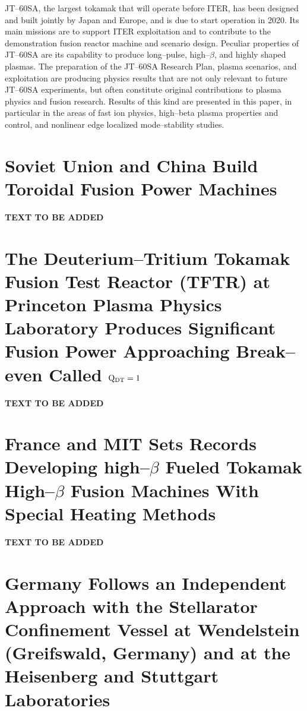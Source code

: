 \documentclass[a4paper,openany,12pt]{book}
\begin{document}
JT--60SA, the largest tokamak that will operate before ITER, has been designed and built jointly by Japan and Europe, and is due to start operation in 2020. Its main missions are to support ITER exploitation and to contribute to the demonstration fusion reactor machine and scenario design. Peculiar properties of JT--60SA are its capability to produce long--pulse, high--$\beta$, and highly shaped plasmas. The preparation of the JT--60SA Research Plan, plasma scenarios, and exploitation are producing physics results that are not only relevant to future JT--60SA experiments, but often constitute original contributions to plasma physics and fusion research. Results of this kind are presented in this paper, in particular in the areas of fast ion physics, high--beta plasma properties and control, and nonlinear edge localized mode--stability studies.


\section{Soviet Union and China Build Toroidal Fusion Power Machines}

\textbf{TEXT TO BE ADDED}

\section[The Deuterium--Tritium Tokamak Fusion Test Reactor (TFTR)]{The Deuterium--Tritium Tokamak Fusion Test Reactor (TFTR) at Princeton Plasma Physics Laboratory Produces Significant Fusion Power Approaching Break--even Called $\mathbf{\rm Q_{\rm DT}=1}$}

\textbf{TEXT TO BE ADDED}

\section[France and MIT Sets Records]{France and MIT Sets Records Developing high--$\beta$ Fueled Tokamak High--$\beta$ Fusion Machines With Special Heating Methods}

\textbf{TEXT TO BE ADDED}

\section[Germany Follows an Independent Approach]{Germany Follows an Independent Approach with the Stellarator Confinement Vessel at Wendelstein (Greifswald, Germany) and at the Heisenberg and Stuttgart Laboratories}
\end{document}
